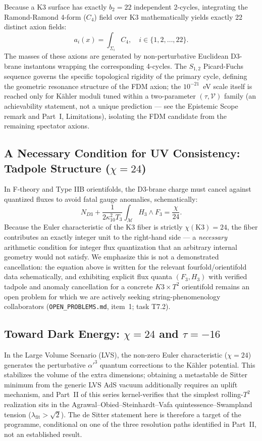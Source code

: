 \documentclass[aps,prd,twocolumn,nofootinbib,superscriptaddress,10pt]{revtex4-2}
\begin{document}
Because a K3 surface has exactly $b_2 = 22$ independent 2-cycles, integrating the Ramond-Ramond 4-form ($C_4$) field over K3 mathematically yields exactly 22 distinct axion fields:
\begin{equation}
    a_i(x) = \int_{\Sigma_i} C_4, \quad i \in \{1, 2, \dots, 22\}.
\end{equation}
The masses of these axions are generated by non-perturbative Euclidean D3-brane instantons wrapping the corresponding 4-cycles. The $S_{1,2}$ Picard-Fuchs sequence governs the specific topological rigidity of the primary cycle, defining the geometric resonance structure of the FDM axion; the $10^{-21}$~eV scale itself is reached only for K\"ahler moduli tuned within a two-parameter $(\tau,\mathcal{V})$ family (an achievability statement, not a unique prediction --- see the Epistemic Scope remark and Part~I, Limitations), isolating the FDM candidate from the remaining spectator axions.

\subsection{A Necessary Condition for UV Consistency: Tadpole Structure ($\chi=24$)}
In F-theory and Type IIB orientifolds, the D3-brane charge must cancel against quantized fluxes to avoid fatal gauge anomalies, schematically:
\begin{equation}
    N_{D3} + \frac{1}{2\kappa_{10}^2 T_3} \int_{\mathcal{M}} H_3 \wedge F_3 = \frac{\chi}{24}.
\end{equation}
Because the Euler characteristic of the K3 fiber is strictly $\chi(\text{K3}) = 24$, the fiber contributes an exactly integer unit to the right-hand side --- a \emph{necessary} arithmetic condition for integer flux quantization that an arbitrary internal geometry would not satisfy. We emphasize this is not a demonstrated cancellation: the equation above is written for the relevant fourfold/orientifold data schematically, and exhibiting explicit flux quanta $(F_3, H_3)$ with verified tadpole and anomaly cancellation for a concrete $K3\times T^2$ orientifold remains an open problem for which we are actively seeking string-phenomenology collaborators (\texttt{OPEN\_PROBLEMS.md}, item~1; task T7.2).

\subsection{Toward Dark Energy: $\chi=24$ and $\tau=-16$}\label{sec:darkenergy}
In the Large Volume Scenario (LVS), the non-zero Euler characteristic ($\chi = 24$) generates the perturbative $\alpha'^3$ quantum corrections to the K\"ahler potential. This stabilizes the volume of the extra dimensions; obtaining a metastable de Sitter minimum from the generic LVS AdS vacuum additionally requires an uplift mechanism, and Part~II of this series kernel-verifies that the simplest rolling-$T^2$ realization sits in the Agrawal--Obied--Steinhardt--Vafa quintessence--Swampland tension ($\lambda_{\mathrm{fit}} > \sqrt{2}$). The de Sitter statement here is therefore a target of the programme, conditional on one of the three resolution paths identified in Part~II, not an established result.
\end{document}
